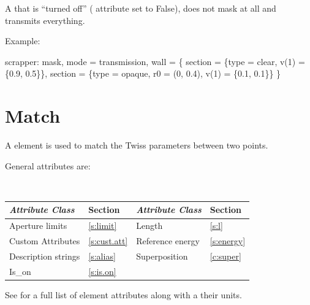 {A  that is ``turned off'' ( attribute set to False), does not mask at all and
transmits everything.

Example:
\begin{example}
scrapper: mask, mode = transmission, wall = \{
    section = \{type = clear, v(1) = \{0.9, 0.5\}\},
    section = \{type = opaque, r0 = (0, 0.4), v(1) = \{0.1, 0.1\}\}
  \}
\end{example}

\newpage

\section{Match}
\label{s:match}

A  element is used to match the Twiss parameters between two
points. 

General  attributes are:
\begin{center} 
\tt
\begin{tabular}{llll} \toprule
  {\sl Attribute Class}      & Section           & {\sl Attribute Class}      & Section         \\ \midrule
  Aperture limits            & \ref{s:limit}     & Length                     & \ref{s:l}       \\
  Custom Attributes          & \ref{s:cust.att}  & Reference energy           & \ref{s:energy}  \\ 
  Description strings        & \ref{s:alias}     & Superposition              & \ref{c:super}   \\ 
  Is_on                      & \ref{s:is.on}     &                            &                 \\
  \bottomrule
\end{tabular}
\end{center}
\toffset
See  for a full list of element attributes along with a their units.

}
